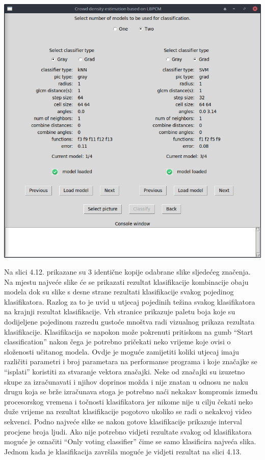 \documentclass[times, utf8, zavrsni, numeric]{fer}
\begin{document}
\begin{minipage}{\linewidth}
\centering
\includegraphics[scale=0.4]{img/cl2.png}
\end{minipage}

\bigbreak

Na slici 4.12. prikazane su 3 identične kopije odabrane slike sljedećeg 
značenja. Na mjestu najveće slike će se prikazati rezultat klasifikacije kombinacije 
obaju modela dok su slike s desne strane rezultati klasifikacije svakog 
pojedinog klasifikatora. 
Razlog za to je uvid u utjecaj pojedinih težina svakog klasifikatora na 
krajnji rezultat klasifikacije. Vrh stranice prikazuje paletu boja koje
su dodijeljene pojedinom razredu gustoće mnoštva radi vizualnog
prikaza rezultata klasifikacije. Klasifikacija se napokon može pokrenuti
pritiskom na gumb \enquote{Start classification} nakon čega je potrebno
pričekati neko vrijeme koje ovisi o složenosti učitanog modela. 
Ovdje je moguće zamijetiti koliki utjecaj imaju različiti parametri i broj parametara 
na performanse programa i koje značajke se \enquote{isplati}
koristiti za stvaranje vektora značajki. Neke od značajki su izuzetno 
skupe za izračunavati i njihov doprinos možda i nije znatan u odnosu 
ne naku drugu koja se brže izračunava stoga je potrebno naći nekakav
kompromis između procesorskog vremena i točnosti klasifikatora jer 
nikome nije u cilju čekati neko duže vrijeme na rezultat klasifikacije pogotovo
ukoliko se radi o nekakvoj video sekvenci.
Podno najveće slike se nakon gotove klasifikacije prikazuje interval
procjene broja ljudi. Ako nije potrebno vidjeti rezultate svakog od
klasifikatora moguće je označiti  \enquote{Only voting classifier}
čime se samo klasificira najveća slika. Jednom kada je klasifikacija 
završila moguće je vidjeti rezultat na slici 4.13.
\end{document}
